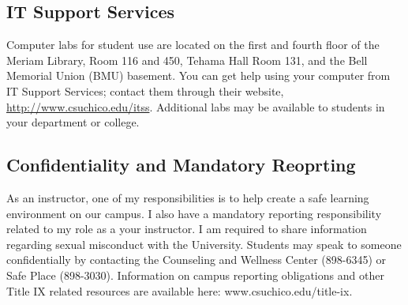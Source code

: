 \documentclass[11pt,]{article}
\begin{document}
\hypertarget{it-support-services}{%
\subsection{IT Support Services}\label{it-support-services}}

Computer labs for student use are located on the first and fourth floor
of the Meriam Library, Room 116 and 450, Tehama Hall Room 131, and the
Bell Memorial Union (BMU) basement. You can get help using your computer
from IT Support Services; contact them through their website,
\url{http://www.csuchico.edu/itss}. Additional labs may be available to
students in your department or college.

\hypertarget{confidentiality-and-mandatory-reoprting}{%
\subsection{Confidentiality and Mandatory
Reoprting}\label{confidentiality-and-mandatory-reoprting}}

As an instructor, one of my responsibilities is to help create a safe
learning environment on our campus. I also have a mandatory reporting
responsibility related to my role as a your instructor. I am required to
share information regarding sexual misconduct with the University.
Students may speak to someone confidentially by contacting the
Counseling and Wellness Center (898-6345) or Safe Place (898-3030).
Information on campus reporting obligations and other Title IX related
resources are available here: www.csuchico.edu/title-ix.
\end{document}
